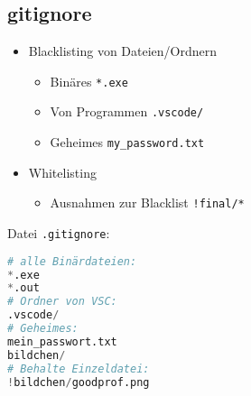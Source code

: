 \subsection{gitignore}
\begin{frame}
\begin{itemize}
\item Blacklisting von Dateien/Ordnern
\begin{itemize}
\item Binäres \hfill \lstinline`*.exe`
\item Von Programmen \hfill \lstinline`.vscode/`
\item Geheimes \hfill \lstinline`my_password.txt`
\end{itemize}
\item Whitelisting
\begin{itemize}
\item Ausnahmen zur Blacklist \hfill \lstinline`!final/*`
\end{itemize}
\end{itemize}
\end{frame}

\begin{frame}[fragile]
Datei \lstinline`.gitignore`:
\begin{lstlisting}[numbers=none, language=python]
# alle Binärdateien:
*.exe
*.out
# Ordner von VSC:
.vscode/
# Geheimes:
mein_passwort.txt
bildchen/
# Behalte Einzeldatei:
!bildchen/goodprof.png
\end{lstlisting}
\end{frame}

